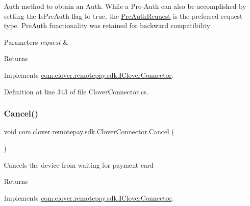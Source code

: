 Auth method to obtain an Auth. While a Pre-\/\+Auth can also be accomplished by setting the Is\+Pre\+Auth flag to true, the \hyperlink{classcom_1_1clover_1_1remotepay_1_1sdk_1_1_pre_auth_request}{Pre\+Auth\+Request} is the preferred request type. Pre\+Auth functionality was retained for backward compatibility 


\begin{DoxyParams}{Parameters}
{\em request} & \\
\hline
\end{DoxyParams}
\begin{DoxyReturn}{Returns}

\end{DoxyReturn}


Implements \hyperlink{interfacecom_1_1clover_1_1remotepay_1_1sdk_1_1_i_clover_connector_af0099cbd3075f3c91f6873265f9c766b}{com.\+clover.\+remotepay.\+sdk.\+I\+Clover\+Connector}.



Definition at line 343 of file Clover\+Connector.\+cs.

\mbox{\label{classcom_1_1clover_1_1remotepay_1_1sdk_1_1_clover_connector_a6ca6015f34bf85df7d4242add5751606}} 
\subsubsection{\texorpdfstring{Cancel()}{Cancel()}}
{\footnotesize\ttfamily void com.\+clover.\+remotepay.\+sdk.\+Clover\+Connector.\+Cancel (\begin{DoxyParamCaption}{ }\end{DoxyParamCaption})}



Cancels the device from waiting for payment card 

\begin{DoxyReturn}{Returns}

\end{DoxyReturn}


Implements \hyperlink{interfacecom_1_1clover_1_1remotepay_1_1sdk_1_1_i_clover_connector_abbb999130d903a88e806c7b396c743f7}{com.\+clover.\+remotepay.\+sdk.\+I\+Clover\+Connector}.



